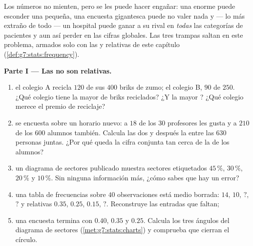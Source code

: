 \begin{problem}
\label{pb:g7:stats:1}
Los números no mienten, pero se les puede hacer engañar: una  enorme
puede esconder una  pequeña, una encuesta gigantesca puede no valer nada
y --- lo más extraño de todo --- un hospital puede ganar a su rival en
\emph{todas} las categorías de pacientes y aun así perder en las cifras
globales. Las tres trampas saltan en este problema, armados solo
con las  y relativas de este capítulo
(\cref{def:g7:stats:frequency}).

\medskip
\noindent\textbf{Parte I --- Las  no son relativas.}
\begin{enumerate}
  \item el colegio A recicla $120$ de sus $400$ briks de zumo;
        el colegio B, $90$ de $250$. ¿Qué colegio tiene la mayor
        \emph{} de briks reciclados? ¿Y la mayor
        \emph{}? ¿Qué colegio merece el premio de
        reciclaje?
  \item se encuesta sobre un horario nuevo: a $18$ de los $30$ profesores
        les gusta y a $210$ de los $600$ alumnos también. Calcula las
        dos  y después la  entre las $630$
        personas juntas. ¿Por qué queda la cifra conjunta tan
        cerca de la de los alumnos?
  \item un diagrama de sectores publicado muestra sectores etiquetados $45\,\%$,
        $30\,\%$, $20\,\%$ y $10\,\%$. Sin ninguna información
        más, ¿cómo sabes que hay un error?
  \item una tabla de frecuencias sobre $40$ observaciones está medio borrada:
         $14$, $10$, $?$, $?$ y relativas $0.35$,
        $0.25$, $0.15$, $?$. Reconstruye las entradas que faltan;
  \item una encuesta termina con  $0.40$, $0.35$ y
        $0.25$. Calcula los tres ángulos del diagrama de sectores
        (\cref{met:g7:stats:charts}) y comprueba que cierran el
        círculo.
\end{enumerate}


\end{problem}
